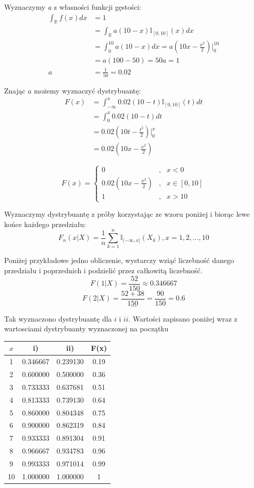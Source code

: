 \documentclass{article}
\begin{document}
Wyznaczymy \textit{a} z własności funkcji gęstości:
\begin{align*}
\int_\mathbb{R} f(x) dx & = 1 \\
& = \int_\mathbb{R} a(10-x) \mathbb{I}_{[0,10]}(x) dx \\
& = \int_0^{10} a(10 - x) dx = a(10x - \frac{x^2}{2}) \Big\vert_0^{10} \\
& = a(100 - 50) = 50a = 1 \\
a & = \frac{1}{50} = 0.02
\end{align*}

Znając $a$ możemy wyznaczyć dystrybuantę:
\begin{align*} F(x) & = \int_{-\infty}^x 0.02(10 - t) \mathbb{I}_{[0,10]}(t) dt \\
& = \int_0^x 0.02(10 - t) dt \\
& = 0.02(10t - \frac{t^2}{2}) \Big\vert_0^x \\
& = 0.02(10x - \frac{x^2}{2})
\end{align*}

\[ F(x) = \left\{ \begin{array}{ccc}
0 & , & x < 0 \\
0.02(10x - \frac{x^2}{2}) & , & x \in [0,10] \\
1 & , & x > 10
\end{array} \right. \]

Wyznaczymy dystrybuantę z próby korzystając ze wzoru poniżej i biorąc lewe końce każdego przedziału:
\[ F_n(x|X) = \frac{1}{n} \sum_{k=1}^n \mathbb{I}_{(-\infty,x]}(X_k), x = 1,2,\dots, 10 \]

Poniżej przykładowe jedno obliczenie, wystarczy wziąć liczebność danego przedziału i poprzednich i podzielić przez całkowitą liczebność.
\[ F(1|X) = \frac{52}{150} \approx 0.346667 \]
\[ F(2|X) = \frac{52 + 38}{150} = \frac{90}{150} = 0.6 \] 
\[ \dots \]

Tak wyznaczono dystrybuantę dla $i$ i $ii$. Wartości zapisano poniżej wraz z wartosciami dystrybuanty wyznaczonej na początku
\begin{center} \begin{tabular}{|c|c|c|c|} \hline
$x$ & i) & ii) & F(x) \\ \hline
1 & 0.346667 & 0.239130 & 0.19\\ \hline
2 & 0.600000 & 0.500000 & 0.36\\ \hline
3 & 0.733333 & 0.637681 & 0.51\\ \hline
4 & 0.813333 & 0.739130 & 0.64\\ \hline
5 & 0.860000 & 0.804348 & 0.75\\ \hline
6 & 0.900000 & 0.862319 & 0.84\\ \hline
7 & 0.933333 & 0.891304 & 0.91\\ \hline
8 & 0.966667 & 0.934783 & 0.96\\ \hline
9 & 0.993333 & 0.971014 & 0.99\\ \hline
10 & 1.000000 & 1.000000 & 1\\ \hline
\end{tabular} \end{center}
\end{document}

